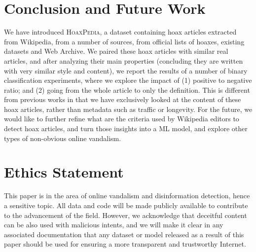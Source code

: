 {\begin{table}[]
\centering
{}
\caption{Performance of RoBERTa-Large on articles without definition sentence(with Fulltext Hoax:Real ratio in Settings column))}
\label{tab:ablation}
\end{table}




\section{Conclusion and Future Work}

We have introduced \textsc{HoaxPedia}, a dataset containing hoax articles extracted from Wikipedia, from a number of sources, from official lists of hoaxes, existing datasets and Web Archive. We paired these hoax articles with similar real articles, and after analyzing their main properties (concluding they are written with very similar style and content), we report the results of a number of binary classification experiments, where we explore the impact of (1) positive to negative ratio; and (2) going from the whole article to only the definition. This is different from previous works in that we have exclusively looked at the content of these hoax articles, rather than metadata such as traffic or longevity. For the future, we would like to further refine what are the criteria used by Wikipedia editors to detect hoax articles, and turn those insights into a ML model, and explore other types of non-obvious online vandalism.


\section{Ethics Statement}

This paper is in the area of online vandalism and disinformation detection, hence a sensitive topic. All data and code will be made publicly available to contribute to the advancement of the field. However, we acknowledge that deceitful content can be also used with malicious intents, and we will make it clear in any associated documentation that any dataset or model released as a result of this paper should be used for ensuring a more transparent and trustworthy Internet.

}
